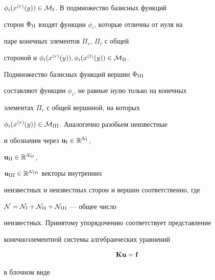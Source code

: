 $\phi_i(x^{(r)}(y)) \in {\cal M}_{\mathrm{I}}$. В подмножество базисных функций 


сторон $\Phi_{\mathrm{II}}$ входят функции $\phi_i$, которые отличны от нуля на 


паре конечных элементов $\Pi_r$, $\Pi_t$ с общей


стороной и $\phi_i(x^{(r)}(y)), \phi_i(x^{(t)}(y)) \in {\cal M}_{\mathrm{II}}$.


Подмножество базисных функций вершин $\Phi_{\mathrm{III}}$


составляют функции $\phi_i$, не равные нулю только на конечных


элементах $\Pi_r$ с общей вершиной, на которых 


$\phi_i(x^{(r)}(y)) \in {\cal M}_{\mathrm{III}}$. Аналогично разобьем неизвестные 


и обозначим через ${\bold u}_{\mathrm{I}}\in \Bbb R^{{\cal N}_{\mathrm{I}}}$,


${\bold u}_{\mathrm{II}}\in \Bbb R^{{\cal N}_{\mathrm{II}}}$,


${\bold u}_{\mathrm{III}}\in {\Bbb R}^{{\cal N}_{\mathrm{III}}}$ векторы внутренних 


неизвестных и неизвестных сторон и вершин соответственно, где


${\cal {N}}={\cal {N}}_{\mathrm{I}}+{\cal N}_{\mathrm{II}}+{\cal N}_{\mathrm{III}}$ --- общее число 


неизвестных. Принятому упорядочению соответствует представление 


конечноэлементной системы алгебраических уравнений 


\begin{equation}


\label{slau}


{\bold K}{\bold u} = {\bold f}


\end{equation}


в блочном виде


